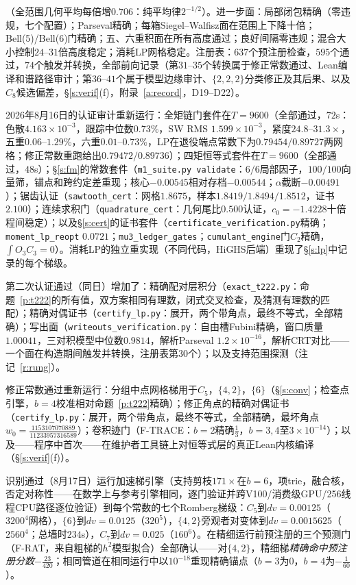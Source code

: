 \documentclass[11pt]{article}
\numberwithin{equation}{section}
\theoremstyle{definition}
\theoremstyle{remark}
\begin{document}
\noindent（全范围几何平均每倍增$0.706$：纯平均律$2^{-1/2}$）。进一步面：局部闭包精确（零违规，七个配置）；Parseval精确；每箱Siegel--Walfisz面在范围上下降十倍；Bell(5)/Bell(6)门精确；五、六重积面在所有高度通过；良好间隔零违规；混合大小控制$24$--$31$倍高度稳定；消耗LP网格稳定。注册表：$637$个预注册检查，$595$个通过，$74$个触发并转换，全部前向记录（第$31$--$35$个转换属于修正常数通过、Lean编译和谱路径审计；第$36$--$41$个属于模型边缘审计、$\{2,2,2\}$分类修正及其后果、以及$C_8$候选偏差，\S\ref{s:verif}(f)，附录~\ref{a:record}，D19--D22）。

2026年8月16日的认证审计重新运行：全矩链门套件在$T=9600$（全部通过，$72$s：色散$4.163\times 10^{-3}$，跟踪中位数$0.73\%$，SW RMS $1.599\times10^{-3}$，紧度$24.8$--$31.3\times$，五重$0.06$--$1.29\%$，六重$0.01$--$0.73\%$，LP在退役端点常数下为$0.79454/0.89727$两网格；修正常数重跑给出$0.79472/0.89736$）；四矩恒等式套件在$T=9600$（全部通过，$48$s）；\S\ref{s:fm}的常数套件（\texttt{m1\_suite.py validate}：$6/6$局部因子，$100/100$向量筛，锚点和跨约定差重现；核心$-0.00545$相对存档$-0.00544$；$\alpha$截断$-0.00491$）；锯齿认证（\texttt{sawtooth\_cert}：网格$1.8675$，样本$1.8419/1.8494/1.8512$，证书$2.100$）；连续求积门（\texttt{quadrature\_cert}：几何尾比$0.500$认证，$c_0=-1.4228$十倍程间稳定）；以及\S\ref{s:cert}的证书套件（\texttt{certificate\_verification.py}精确；\texttt{moment\_lp\_reopt} $0.0721$；\texttt{mu3\_ledger\_gates}；\texttt{cumulant\_engine}门$C_2$精确，$\int O_3C_3=0$）。消耗LP的独立重实现（不同代码，HiGHS后端）重现了\S\ref{s:lp}中记录的每个梯级。

第二次认证通过（同日）增加了：精确配对层积分（\texttt{exact\_t222.py}：命题~\ref{p:t222}的所有值，双方案相同有理数，闭式交叉检查，及猜测有理数的匹配）；精确对偶证书（\texttt{certify\_lp.py}：展开，两个带角点，最终不等式，全部精确）；写出面（\texttt{writeouts\_verification.py}：自由槽Fubini精确，窗口质量$1.00041$，三对积模型中位数$0.9814$，解析Parseval $1.2\times10^{-16}$，解析CRT对比——一个面在构造期间触发并转换，注册表第30个）；以及支持范围探测（注记~\ref{r:rung}）。

修正常数通过重新运行：分组中点网格梯用于$C_5$，$\{4,2\}$，$\{6\}$（\S\ref{s:conv}；检查点引擎，$b=4$校准相对命题~\ref{p:t222}精确）；修正角点的精确对偶证书（\texttt{certify\_lp.py}：展开，两个带角点，最终不等式，全部精确，最坏角点$w_0=\tfrac{1153107070889}{11233957316589}$）；卷积迹门（F-TRACE：$b=2$精确$\tfrac13$，$b=3,4$至$3\times10^{-14}$）；以及——程序中首次——在维护者工具链上对恒等式层的真正Lean内核编译（\S\ref{s:verif}(f)）。

识别通过（8月17日）运行加速梯引擎（支持剪枝$171\times$在$b=6$，项trie，融合核，否定对称性——在数学上与参考引擎相同，逐门验证并跨V100/消费级GPU/256线程CPU路径逐位验证）到每个常数的七个Romberg梯级：$C_5$到$dv=0.00125$（$3200^4$网格），$\{6\}$到$dv=0.0125$（$320^5$），$\{4,2\}$旁观者对变体到$dv=0.0015625$（$2560^4$；总墙时$234$s），$C_7$到$dv=0.025$（$160^6$）。在精细运行前预注册的三个预测门（F-RAT，来自粗梯的$h^{2}$模型拟合）全部确认——对$\{4,2\}$，精细梯\emph{精确命中预注册分数}$-\tfrac{23}{420}$；相同管道在相同运行中以$10^{-18}$重现精确锚点（$b=3$为$0$，$b=4$为$-\tfrac1{60}$）。
\end{document}
